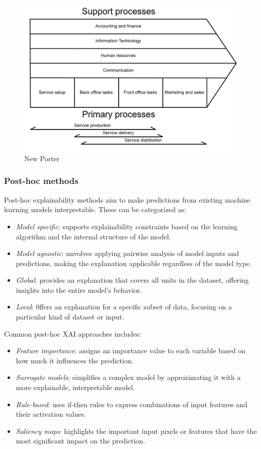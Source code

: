 \begin{figure}[H]
    \centering
    \includegraphics[width=0.5\linewidth]{images/bis13.png}
    \caption{New Porter}
\end{figure}

\subsubsection{Post-hoc methods}
Post-hoc explainability methods aim to make predictions from existing machine learning models interpretable. 
These can be categorized as:
\begin{itemize}
    \item \textit{Model specific}: supports explainability constraints based on the learning algorithm and the internal structure of the model.
    \item \textit{Model agnostic}: nnvolves applying pairwise analysis of model inputs and predictions, making the explanation applicable regardless of the model type.
    \item \textit{Global}: provides an explanation that covers all units in the dataset, offering insights into the entire model's behavior.
    \item \textit{Local}: 0ffers an explanation for a specific subset of data, focusing on a particular kind of dataset or input.
\end{itemize}
\noindent Common post-hoc XAI approaches includes:
\begin{itemize}
    \item \textit{Feature importance}: assigns an importance value to each variable based on how much it influences the prediction. 
    \item \textit{Surrogate models}: simplifies a complex model by approximating it with a more explainable, interpretable model.
    \item \textit{Rule-based}: uses if-then rules to express combinations of input features and their activation values.
    \item \textit{Saliency maps}: highlights the important input pixels or features that have the most significant impact on the prediction.
\end{itemize}

